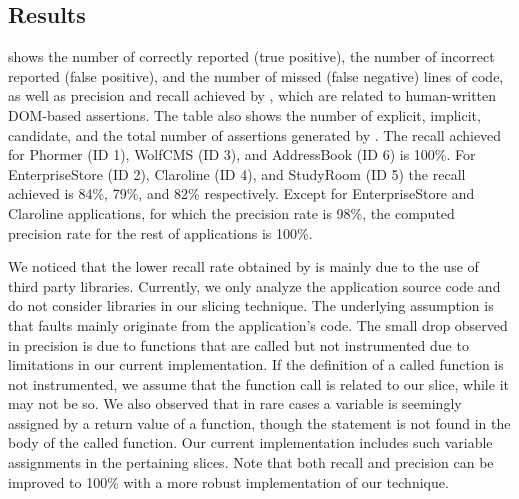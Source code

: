 \subsection{Results} \label{Sec:results}
 shows the number of  correctly reported (true positive), the number of incorrect reported (false positive), and the number of missed (false negative) \javascript lines of code, as well as precision and recall achieved by \tool, which are related to human-written DOM-based assertions. The table also shows the number of explicit, implicit, candidate, and the total number of assertions generated by \tool. The recall achieved for Phormer (ID 1), WolfCMS (ID 3), and AddressBook (ID 6) is 100\%. For EnterpriseStore (ID 2), Claroline (ID 4), and StudyRoom (ID 5) the recall achieved is 84\%, 79\%, and 82\% respectively. Except for EnterpriseStore and Claroline applications, for which the precision rate is 98\%, the computed precision rate for the rest of applications is 100\%.

We noticed that the lower recall rate obtained by \tool is mainly due to the use of third party libraries. Currently, we only analyze the application source code and do not consider libraries in our slicing technique. The underlying assumption is that faults mainly originate from the application's code. The small drop observed in precision is due to functions that are called but not instrumented due to limitations in our current implementation. If the definition of a called function is not instrumented, we assume that the function call is related to our slice, while it may not be so. 
We also observed that in rare cases a variable is seemingly assigned by a return value of a function, though the  statement is not found in the body of the called function. Our current implementation includes such variable assignments in the pertaining slices. 
Note that both recall and precision can be improved to 100\% with a more robust implementation of our technique. 

